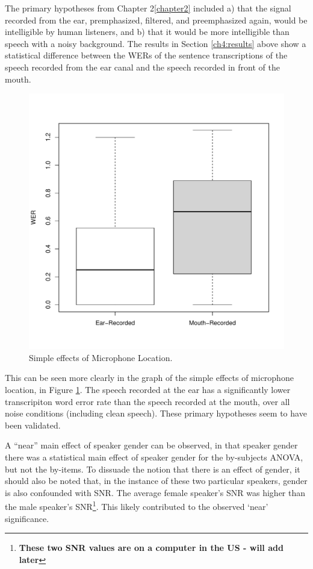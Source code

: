 \documentclass[dissertation,copyright]{uathesis}
\makeatletter
\def\maxwidth{ %
  \ifdim\Gin@nat@width>\linewidth
    \linewidth
  \else
    \Gin@nat@width
  \fi
}
\makeatother
\begin{document}
The primary hypotheses from Chapter 2\ref{chapter2} included a) that the signal recorded from the ear, premphasized, filtered, and preemphasized again, would be intelligible by human listeners, and b) that it would be more intelligible than speech with a noisy background.  The results in Section \ref{ch4:results} above show a statistical difference between the WERs of the sentence transcriptions of the speech recorded from the ear canal and the speech recorded in front of the mouth.  
%
\begin{figure}

\includegraphics[width=\maxwidth]{figure/Mic-location_simple-1} 

\caption{Simple effects of Microphone Location.}
\label{fig:mic_loc_simple}
\end{figure}
%
This can be seen more clearly in the graph of the simple effects of microphone location, in Figure \ref{fig:mic_loc_simple}.  The speech recorded at the ear has a significantly lower transcripiton word error rate than the speech recorded at the mouth, over all noise conditions (including clean speech). These primary hypotheses seem to have been validated.

A ``near'' main effect of speaker gender can be observed, in that speaker gender there was a statistical main effect of speaker gender for the by-subjects ANOVA, but not the by-items.  To dissuade the notion that there is an effect of gender, it should also be noted that, in the instance of these two particular speakers, gender is also confounded with SNR.  The average female speaker's SNR was higher than the male speaker's SNR\footnote{\textbf{These two SNR values are on a computer in the US - will add later}}.  This likely contributed to the observed `near' significance.
\end{document}
